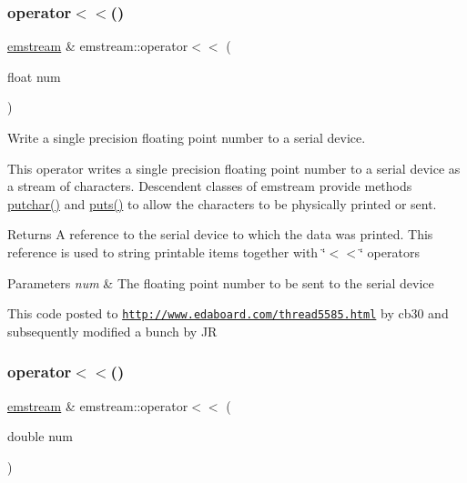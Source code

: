 \subsubsection{\texorpdfstring{operator$<$$<$()}{operator<<()}\hspace{0.1cm}{\footnotesize\ttfamily [12/14]}}
{\footnotesize\ttfamily \mbox{\hyperlink{classemstream}{emstream}} \& emstream\+::operator$<$$<$ (\begin{DoxyParamCaption}\item[{float}]{num }\end{DoxyParamCaption})}



Write a single precision floating point number to a serial device. 

This operator writes a single precision floating point number to a serial device as a stream of characters. Descendent classes of {\ttfamily emstream} provide methods {\ttfamily \mbox{\hyperlink{classemstream_aa4dffc9aa58f601cc4153b4cbe65d757}{putchar()}}} and {\ttfamily \mbox{\hyperlink{classemstream_a1ad530cbebe6c54640c1db8c1b9afda2}{puts()}}} to allow the characters to be physically printed or sent. \begin{DoxyReturn}{Returns}
A reference to the serial device to which the data was printed. This reference is used to string printable items together with \char`\"{}$<$$<$\char`\"{} operators 
\end{DoxyReturn}

\begin{DoxyParams}{Parameters}
{\em num} & The floating point number to be sent to the serial device \\
\hline
\end{DoxyParams}
This code posted to {\ttfamily \href{http://www.edaboard.com/thread5585.html}{\tt http\+://www.\+edaboard.\+com/thread5585.\+html}} by {\ttfamily cb30} and subsequently modified a bunch by JR \mbox{\label{classemstream_a14caec5bbf12dd25ae39c72a95bebf0b}} 
\subsubsection{\texorpdfstring{operator$<$$<$()}{operator<<()}\hspace{0.1cm}{\footnotesize\ttfamily [13/14]}}
{\footnotesize\ttfamily \mbox{\hyperlink{classemstream}{emstream}} \& emstream\+::operator$<$$<$ (\begin{DoxyParamCaption}\item[{double}]{num }\end{DoxyParamCaption})}

